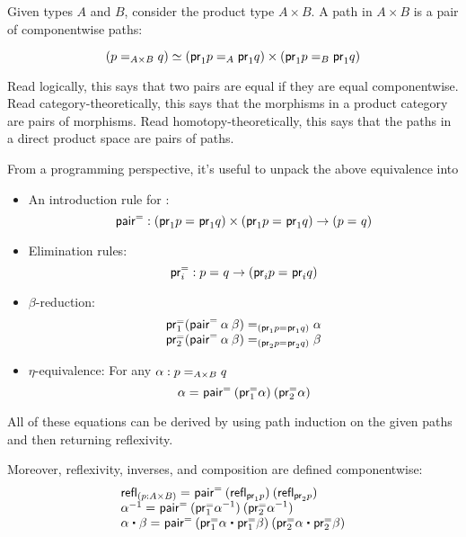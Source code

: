 Given types $A$ and $B$, consider the product type $A \times B$.  
A path in $A \times B$ is a pair of componentwise paths:

\[
\eqv{(\id[A \times B] p q)}{(\id[A]{\proj{1} p}{\proj{1} q}) \times (\id[B]{\proj{1} p}{\proj{1} q})}
\]

Read logically, this says that two pairs are equal if they are equal
componentwise.  Read category-theoretically, this says that the
morphisms in a product category are pairs of morphisms.  Read
homotopy-theoretically, this says that the paths in a direct product
space are pairs of paths.  

From a programming perspective, it's useful to unpack the above
equivalence into 

\newcommand{\pairpath}{\mathsf{pair}^{\mathord{=}}}
\newcommand{\projpath}[1]{\proj{#1}^{\mathord{=}}}

\begin{itemize}
\item An introduction rule for :
  \[
  \pairpath : (\id{\proj{1} p}{\proj{1} q}) \times (\id{\proj{1} p}{\proj{1} q}) \to {(\id p q)}
  \]
\item Elimination rules:
  \[
  \projpath{i} : \id{p}{q} \to (\id{\proj{i} p}{\proj{i} q})
  \]
\item $\beta$-reduction:
  \[
  \begin{array}{l}
  \id[(\id{\proj{1} p}{\proj{1} q})]
       {\projpath{1}{(\pairpath \: \alpha \: \beta})}
       {\alpha} \\
  \id[(\id{\proj{2} p}{\proj{2} q})]
       {\projpath{2}{(\pairpath \: \alpha \: \beta})}
       {\beta}
  \end{array}
  \]
\item $\eta$-equivalence: For any $\alpha : \id[A \times B] p q$
  \[
  \id{\alpha}{\pairpath \: (\projpath{1} \alpha) \: (\projpath{2} \alpha) }
  \]
\end{itemize}
All of these equations can be derived by using path induction on the given
paths and then returning reflexivity.  

Moreover, reflexivity, inverses, and composition are defined
componentwise:
\[
\begin{array}{l}
\id {\refl{(p : A \times B)}} {\pairpath \: (\refl{\proj{1} p}) \: (\refl{\proj{2} p})} \\
\id {\opp{\alpha}} {\pairpath \: (\opp{\projpath{1} \alpha}) \: (\opp{\projpath{2} \alpha})}  \\
\id {{\alpha \ct \beta}} {\pairpath \: 
  ({\projpath{1} \alpha} \ct
   {\projpath{1} \beta})
   \: 
   ({\projpath{2} \alpha} \ct {\projpath{2} \beta})}
\end{array}
\]


